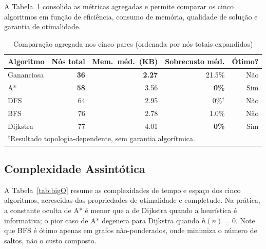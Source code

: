 \documentclass[conference]{IEEEtran}
\begin{document}
A Tabela~\ref{tab:agregado} consolida as métricas agregadas e permite comparar
os cinco algoritmos em função de eficiência, consumo de memória, qualidade de
solução e garantia de otimalidade.

\begin{table}[t]
\caption{Comparação agregada nos cinco pares (ordenada por nós totais expandidos)}
\label{tab:agregado}
\centering
\scriptsize
\begin{tabular}{lrrrr}
\toprule
Algoritmo  & Nós total       & Mem.\ méd.\ (KB) & Sobrecusto méd. & Ótimo? \\
\midrule
Gananciosa & \textbf{36}     & \textbf{2.27}    & 21.5\%          & Não    \\
A*         & \textbf{58}     & 3.56             & \textbf{0\%}    & Sim    \\
DFS        & 64              & 2.95             & 0\%$^\dagger$   & Não    \\
BFS        & 76              & 2.78             & 1.0\%           & Não    \\
Dijkstra   & 77              & 4.01             & \textbf{0\%}    & Sim    \\
\bottomrule
\multicolumn{5}{l}{$^\dagger$Resultado topologia-dependente, sem garantia algorítmica.} \\
\end{tabular}
\end{table}

\subsection{Complexidade Assintótica}

A Tabela~\ref{tab:bigO} resume as complexidades de tempo e espaço dos
cinco algoritmos, acrescidas das propriedades de otimalidade e completude.
Na prática, a constante oculta de A* é menor que a de Dijkstra quando a
heurística é informativa; o pior caso de A* degenera para Dijkstra quando
$h(n) = 0$. Note que BFS é ótimo apenas em grafos não-ponderados, onde
minimiza o número de saltos, não o custo composto.
\end{document}
